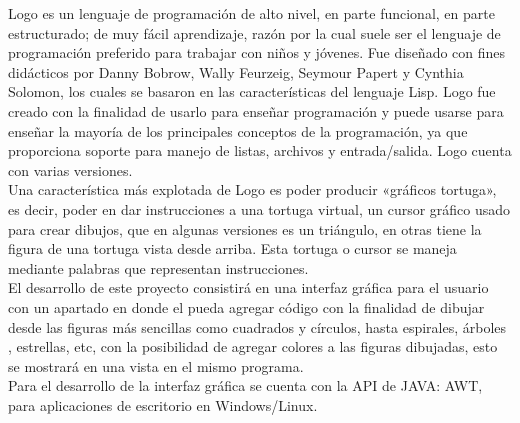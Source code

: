 Logo es un lenguaje de programación de alto nivel, en parte funcional, en parte estructurado; de muy fácil aprendizaje, razón por la cual suele ser el lenguaje de programación preferido para trabajar con niños y jóvenes. Fue diseñado con fines didácticos por Danny Bobrow, Wally Feurzeig, Seymour Papert y Cynthia Solomon, los cuales se basaron en las características del lenguaje Lisp. Logo fue creado con la finalidad de usarlo para enseñar programación y puede usarse para enseñar la mayoría de los principales conceptos de la programación, ya que proporciona soporte para manejo de listas, archivos y entrada/salida. Logo cuenta con varias versiones.\\

Una característica más explotada de Logo es poder producir «gráficos tortuga», es decir, poder en dar instrucciones a una tortuga virtual, un cursor gráfico usado para crear dibujos, que en algunas versiones es un triángulo, en otras tiene la figura de una tortuga vista desde arriba. Esta tortuga o cursor se maneja mediante palabras que representan instrucciones.\\

El desarrollo de este proyecto consistirá en una interfaz gráfica para el usuario con un apartado en donde el pueda agregar código con la finalidad de dibujar desde las figuras más sencillas como cuadrados y círculos, hasta espirales, árboles , estrellas, etc, con la posibilidad de agregar colores a las figuras dibujadas, esto se mostrará en una vista en el mismo programa.\\

Para el desarrollo de la interfaz gráfica se cuenta con la API de JAVA: AWT, para 
aplicaciones de escritorio en Windows/Linux. \\